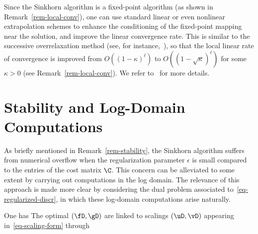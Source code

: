 \begin{rem}
	Since the Sinkhorn algorithm is a fixed-point algorithm (as shown in Remark~\ref{rem-local-conv}), one can use standard linear or even nonlinear extrapolation schemes to enhance the conditioning of the fixed-point mapping near the solution, and improve the linear convergence rate. 
	This is similar to the successive overrelaxation  method (see, for instance,~\citep{hadjidimos2000successive}), so that the local linear rate of convergence is improved from $O((1-\kappa)^\ell)$ to $O((1-\sqrt{\kappa})^\ell)$ for some $\kappa>0$ (see Remark~\ref{rem-local-conv}). 
	We refer to~\citep{2016-peyre-qot} for more details.
\end{rem}



\section{Stability and Log-Domain Computations}

As briefly mentioned in Remark~\ref{rem-stability}, the Sinkhorn algorithm suffers from numerical overflow when the regularization parameter $\epsilon$ is small compared to the entries of the cost matrix $\C$. This concern can be alleviated to some extent by carrying out computations in the log domain. The relevance of this approach is made more clear by considering the dual problem associated to~\eqref{eq-regularized-discr}, in which these log-domain computations arise naturally.

\begin{prop}
One has
%
The optimal $(\fD,\gD)$ are linked to scalings $(\uD,\vD)$ appearing in~\eqref{eq-scaling-form} through 
\end{prop}

